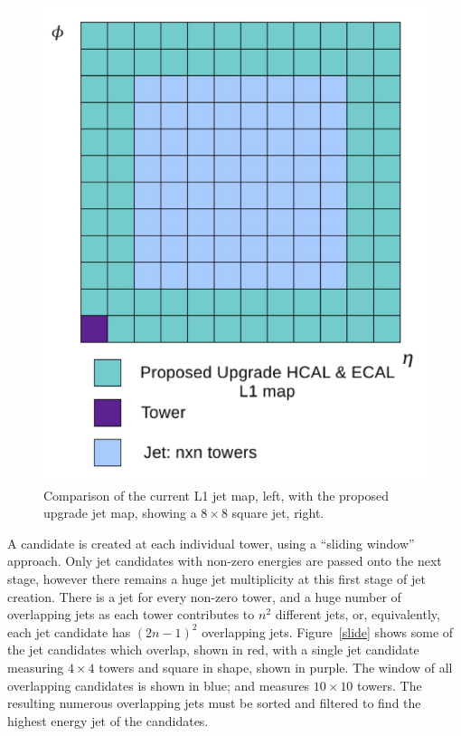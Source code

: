 \begin{figure}[ht]
\begin{center}
  \includegraphics[scale=0.37]{Figures/l1jets/UpgradeJet.jpg} 
\caption{Comparison of the current \ac{L1} jet map, left, with the proposed upgrade jet map, showing a $8\times8$ square jet, right.}
\label{fig:jetcartoon}
\end{center}
\end{figure}


A candidate is created at each individual tower, using a ``sliding window'' approach. 
Only jet candidates with non-zero energies are passed onto the next stage, 
however there remains a huge jet multiplicity at this first stage of jet creation. 
There is a jet for every non-zero tower, and a huge number of overlapping jets as each tower contributes to $n^{2}$ different jets, or, equivalently, each jet candidate has $(2n - 1)^{2}$ overlapping jets.
Figure~\ref{slide} shows some of the jet candidates which overlap, shown in red, with a single jet candidate measuring $4\times4$ towers and square in shape, shown in purple.
The window of all overlapping candidates is shown in blue; and measures $10\times10$ towers.
The resulting numerous overlapping jets must be sorted and filtered to find the highest energy jet of the candidates.

